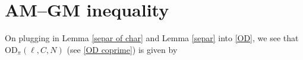 \documentclass[12pt,a4paper,twoside, reqno]{amsart}
\newcommand{\shortmod}{\ensuremath{\negthickspace \negthickspace \negthickspace \pmod}}
\newcommand{\e}[2]{e\left(\frac{#1}{#2}\right)}
\begin{document}
\section{AM--GM inequality}
On plugging  in Lemma \ref{separ of char} and Lemma \ref{separ} into  \eqref{OD}, we see that $ \mathrm{OD}_{\pi}(\ell,C, N)$ (see \eqref{OD coprime}) is given by 
\end{document}
